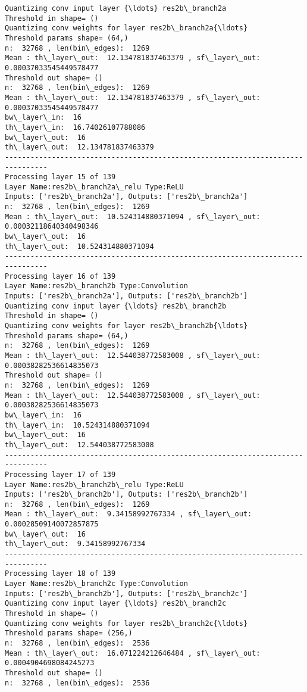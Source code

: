 \documentclass[11pt]{article}
\begin{document}
\begin{Verbatim}[commandchars=\\\{\}]
Quantizing conv input layer {\ldots} res2b\_branch2a
Threshold in shape= ()
Quantizing conv weights for layer res2b\_branch2a{\ldots}
Threshold params shape= (64,)
n:  32768 , len(bin\_edges):  1269
Mean : th\_layer\_out:  12.134781837463379 , sf\_layer\_out:  0.00037033545449578477
Threshold out shape= ()
n:  32768 , len(bin\_edges):  1269
Mean : th\_layer\_out:  12.134781837463379 , sf\_layer\_out:  0.00037033545449578477
bw\_layer\_in:  16
th\_layer\_in:  16.74026107788086
bw\_layer\_out:  16
th\_layer\_out:  12.134781837463379
--------------------------------------------------------------------------------
Processing layer 15 of 139
Layer Name:res2b\_branch2a\_relu Type:ReLU
Inputs: ['res2b\_branch2a'], Outputs: ['res2b\_branch2a']
n:  32768 , len(bin\_edges):  1269
Mean : th\_layer\_out:  10.524314880371094 , sf\_layer\_out:  0.00032118640340498346
bw\_layer\_out:  16
th\_layer\_out:  10.524314880371094
--------------------------------------------------------------------------------
Processing layer 16 of 139
Layer Name:res2b\_branch2b Type:Convolution
Inputs: ['res2b\_branch2a'], Outputs: ['res2b\_branch2b']
Quantizing conv input layer {\ldots} res2b\_branch2b
Threshold in shape= ()
Quantizing conv weights for layer res2b\_branch2b{\ldots}
Threshold params shape= (64,)
n:  32768 , len(bin\_edges):  1269
Mean : th\_layer\_out:  12.544038772583008 , sf\_layer\_out:  0.00038282536614835073
Threshold out shape= ()
n:  32768 , len(bin\_edges):  1269
Mean : th\_layer\_out:  12.544038772583008 , sf\_layer\_out:  0.00038282536614835073
bw\_layer\_in:  16
th\_layer\_in:  10.524314880371094
bw\_layer\_out:  16
th\_layer\_out:  12.544038772583008
--------------------------------------------------------------------------------
Processing layer 17 of 139
Layer Name:res2b\_branch2b\_relu Type:ReLU
Inputs: ['res2b\_branch2b'], Outputs: ['res2b\_branch2b']
n:  32768 , len(bin\_edges):  1269
Mean : th\_layer\_out:  9.34158992767334 , sf\_layer\_out:  0.00028509140072857875
bw\_layer\_out:  16
th\_layer\_out:  9.34158992767334
--------------------------------------------------------------------------------
Processing layer 18 of 139
Layer Name:res2b\_branch2c Type:Convolution
Inputs: ['res2b\_branch2b'], Outputs: ['res2b\_branch2c']
Quantizing conv input layer {\ldots} res2b\_branch2c
Threshold in shape= ()
Quantizing conv weights for layer res2b\_branch2c{\ldots}
Threshold params shape= (256,)
n:  32768 , len(bin\_edges):  2536
Mean : th\_layer\_out:  16.071224212646484 , sf\_layer\_out:  0.0004904698084245273
Threshold out shape= ()
n:  32768 , len(bin\_edges):  2536

\end{Verbatim}
\end{document}
